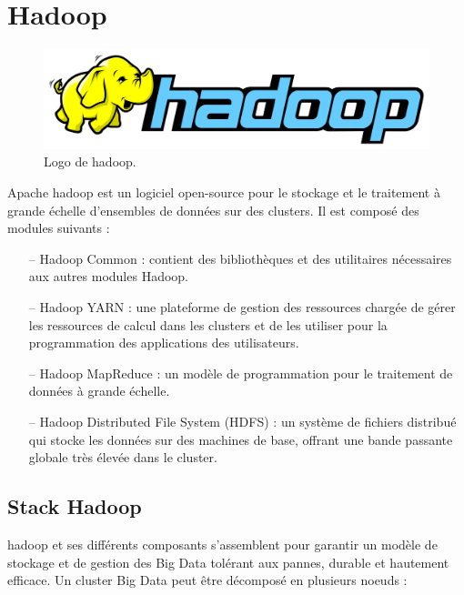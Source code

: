 \documentclass[12pt, french]{report}
\begin{document}
\section{Hadoop}

\begin{figure}[H]
\includegraphics[scale=0.2]{assets/img/logo-hadoop.png}
\centering
\caption{Logo de \gls{hadoop}.}
\label{fig:logo-hadoop}
\end{figure}

Apache \gls{hadoop} est un logiciel open-source pour le stockage et le traitement à grande échelle d'ensembles de données sur des clusters. Il est composé des modules suivants :
\begin{itemize}
  \item[--] Hadoop Common : contient des bibliothèques et des utilitaires nécessaires aux autres modules Hadoop.
  \item[--] Hadoop YARN : une plateforme de gestion des ressources chargée de gérer les ressources de calcul dans les clusters et de les utiliser pour la programmation des applications des utilisateurs.
  \item[--] Hadoop MapReduce : un modèle de programmation pour le traitement de données à grande échelle.
  \item[--] Hadoop Distributed File System (HDFS) : un système de fichiers distribué qui stocke les données sur des machines de base, offrant une bande passante globale très élevée dans le cluster.\\
\end{itemize}

\subsection{Stack Hadoop}

\gls{hadoop} et ses différents composants s'assemblent pour garantir un modèle de stockage et de gestion des Big Data tolérant aux pannes, durable et hautement efficace. Un cluster Big Data peut être décomposé en plusieurs noeuds :
\end{document}
